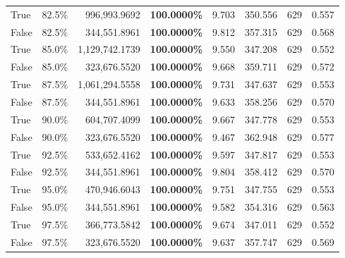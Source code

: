 \begin{table}[H]
\begin{tabular}{|m{}| m{}| r | R{0.13\textwidth}| R{0.09\textwidth}| R{0.09\textwidth}| R{0.09\textwidth}| R{0.11\textwidth}}
True & 82.5\% & 996,993.9692 & \bfseries \color{red} 100.0000\% & 9.703 & 350.556 & 629 & 0.557 \\
False & 82.5\% & 344,551.8961 & \bfseries \color{red} 100.0000\% & 9.812 & 357.315 & 629 & 0.568 \\
True & 85.0\% & 1,129,742.1739 & \bfseries \color{red} 100.0000\% & 9.550 & 347.208 & 629 & 0.552 \\
False & 85.0\% & 323,676.5520 & \bfseries \color{red} 100.0000\% & 9.668 & 359.711 & 629 & 0.572 \\
True & 87.5\% & 1,061,294.5558 & \bfseries \color{red} 100.0000\% & 9.731 & 347.637 & 629 & 0.553 \\
False & 87.5\% & 344,551.8961 & \bfseries \color{red} 100.0000\% & 9.633 & 358.256 & 629 & 0.570 \\
True & 90.0\% & 604,707.4099 & \bfseries \color{red} 100.0000\% & 9.667 & 347.778 & 629 & 0.553 \\
False & 90.0\% & 323,676.5520 & \bfseries \color{red} 100.0000\% & 9.467 & 362.948 & 629 & 0.577 \\
True & 92.5\% & 533,652.4162 & \bfseries \color{red} 100.0000\% & 9.597 & 347.817 & 629 & 0.553 \\
False & 92.5\% & 344,551.8961 & \bfseries \color{red} 100.0000\% & 9.804 & 358.412 & 629 & 0.570 \\
True & 95.0\% & 470,946.6043 & \bfseries \color{red} 100.0000\% & 9.751 & 347.755 & 629 & 0.553 \\
False & 95.0\% & 344,551.8961 & \bfseries \color{red} 100.0000\% & 9.582 & 354.316 & 629 & 0.563 \\
True & 97.5\% & 366,773.5842 & \bfseries \color{red} 100.0000\% & 9.674 & 347.011 & 629 & 0.552 \\
False & 97.5\% & 323,676.5520 & \bfseries \color{red} 100.0000\% & 9.637 & 357.747 & 629 & 0.569 \\
\bottomrule
\end{tabular}
\end{table}
